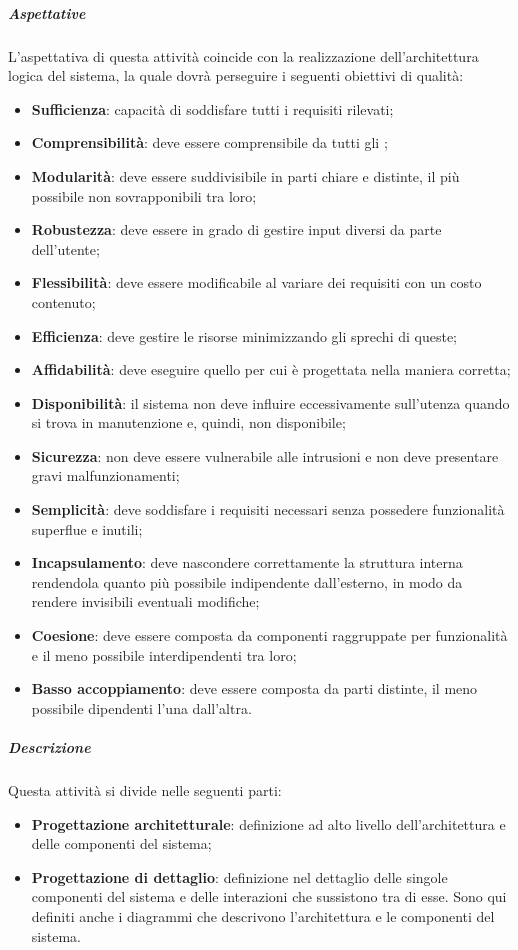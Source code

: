 \documentclass[../norme-di-progetto.tex]{subfiles}
\begin{document}
\subparagraph{Aspettative}
L'aspettativa di questa attività coincide con la realizzazione dell'architettura logica del sistema, la quale dovrà perseguire i seguenti obiettivi di qualità:
\begin{itemize}
  \item \textbf{Sufficienza}: capacità di soddisfare tutti i requisiti rilevati;
  \item \textbf{Comprensibilità}: deve essere comprensibile da tutti gli ;
  \item \textbf{Modularità}: deve essere suddivisibile in parti chiare e distinte, il più possibile non sovrapponibili tra loro;
  \item \textbf{Robustezza}: deve essere in grado di gestire input diversi da parte dell'utente;
  \item \textbf{Flessibilità}: deve essere modificabile al variare dei requisiti con un costo contenuto;
  \item \textbf{Efficienza}: deve gestire le risorse minimizzando gli sprechi di queste;
  \item \textbf{Affidabilità}: deve eseguire quello per cui è progettata nella maniera corretta;
  \item \textbf{Disponibilità}: il sistema non deve influire eccessivamente sull'utenza quando si trova in manutenzione e, quindi, non disponibile;
  \item \textbf{Sicurezza}: non deve essere vulnerabile alle intrusioni e non deve presentare gravi malfunzionamenti;
  \item \textbf{Semplicità}: deve soddisfare i requisiti necessari senza possedere funzionalità superflue e inutili;
  \item \textbf{Incapsulamento}: deve nascondere correttamente la struttura interna rendendola quanto più possibile indipendente dall'esterno, in modo da rendere invisibili eventuali modifiche;
  \item \textbf{Coesione}: deve essere composta da componenti raggruppate per funzionalità e il meno possibile interdipendenti tra loro;
  \item \textbf{Basso accoppiamento}: deve essere composta da parti distinte, il meno possibile dipendenti l'una dall'altra.
\end{itemize}

\subparagraph{Descrizione}
Questa attività si divide nelle seguenti parti:
\begin{itemize}
  \item \textbf{Progettazione architetturale}: definizione ad alto livello dell'architettura e delle componenti del sistema;
  \item \textbf{Progettazione di dettaglio}: definizione nel dettaglio delle singole componenti del sistema e delle interazioni che sussistono tra di esse. Sono qui definiti anche i diagrammi che descrivono l'architettura e le componenti del sistema.
\end{itemize}
\end{document}
